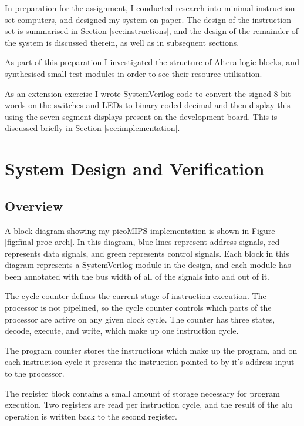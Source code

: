 In preparation for the assignment, I conducted research into minimal instruction set computers, and designed my system on paper. The design of the instruction set is summarised in Section \ref{sec:instructions}, and the design of the remainder of the system is discussed therein, as well as in subsequent sections.

As part of this preparation I investigated the structure of Altera logic blocks, and synthesised small test modules in order to see their resource utilisation.

As an extension exercise I wrote SystemVerilog code to convert the signed 8-bit words on the switches and LEDs to binary coded decimal and then display this using the seven segment displays present on the development board. This is discussed briefly in Section \ref{sec:implementation}.


\section{System Design and Verification} \label{sec:design-verif}

\subsection{Overview} \label{sec:sys-overview}

A block diagram showing my picoMIPS implementation is shown in Figure \ref{fig:final-proc-arch}. In this diagram, blue lines represent address signals, red represents data signals, and green represents control signals. Each block in this diagram represents a SystemVerilog module in the design, and each module has been annotated with the bus width of all of the signals into and out of it.

The cycle counter defines the current stage of instruction execution. The processor is not pipelined, so the cycle counter controls which parts of the processor are active on any given clock cycle. The counter has three states, decode, execute, and write, which make up one instruction cycle.

The program counter stores the instructions which make up the program, and on each instruction cycle it presents the instruction pointed to by it's address input to the processor.

The register block contains a small amount of storage necessary for program execution. Two registers are read per instruction cycle, and the result of the \gls{alu} operation is written back to the second register.

